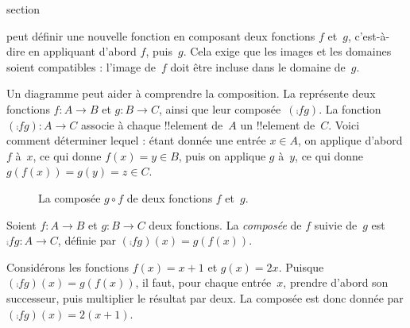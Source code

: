 \documentclass[11pt,a4paper,openany]{memoir}
\begin{document}
\endgroup



\begingroup
\expandafter\def\csname ol@sectioncs\endcsname{section}
\def\olfilename{composition}



\begin{explain}
peut définir une nouvelle fonction en composant deux fonctions $f$ et~$g$,
c’est-à-dire en appliquant d’abord $f$, puis~$g$. Cela exige que les
images et les domaines soient compatibles : l’image de~$f$ doit être
incluse dans le domaine de~$g$.

Un diagramme peut aider à comprendre la composition. La
 représente deux fonctions $f\colon A \to B$
et $g\colon B \to C$, ainsi que leur composée~$(\comp{f}{g})$.
La fonction $(\comp{f}{g})\colon A \to C$ associe à chaque !!{element}
de~$A$ un !!{element} de~$C$. Voici comment déterminer lequel :
étant donnée une entrée $x \in A$, on applique d’abord $f$ à~$x$,
ce qui donne $f(x) = y \in B$, puis on applique $g$ à~$y$,
ce qui donne $g(f(x)) = g(y) = z \in C$.
\begin{figure}
  \caption{La composée $g \circ f$ de deux fonctions $f$ et~$g$.}
\end{figure}
\end{explain}

\begin{defn}[Composition]
Soient $f\colon A \to B$ et $g\colon B \to C$ deux fonctions.
La \emph{composée} de $f$ suivie de~$g$ est
$\comp{f}{g}\colon A \to C$, définie par
$(\comp{f}{g})(x) = g(f(x))$.
\end{defn}

\begin{ex}
Considérons les fonctions $f(x) = x + 1$ et $g(x) = 2x$.
Puisque $(\comp{f}{g})(x) = g(f(x))$, il faut, pour chaque entrée~$x$,
prendre d’abord son successeur, puis multiplier le résultat par deux.
La composée est donc donnée par $(\comp{f}{g})(x) = 2(x+1)$.
\end{ex}
\end{document}
